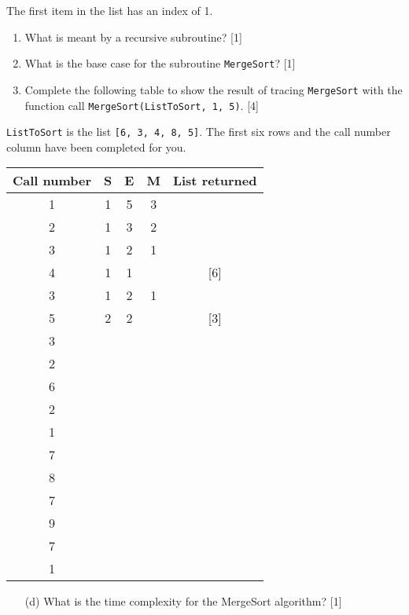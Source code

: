 The first item in the list has an index of 1. 
\begin{enumerate}
\item What is meant by a recursive subroutine? \hfill{}{[}1{]}
\item What is the base case for the subroutine \texttt{MergeSort}? \hfill{}
{[}1{]}
\item Complete the following table to show the result of tracing \texttt{MergeSort}
with the function call \texttt{MergeSort(ListToSort, 1, 5)}. \hfill{}{[}4{]}
\end{enumerate}
\texttt{ListToSort} is the list \texttt{{[}6, 3, 4, 8, 5{]}}. The
first six rows and the call number column have been completed for
you. 
\noindent \begin{center}
\begin{tabular}{|c|c|c|c|c|}
\hline 
\textbf{Call number} & \textbf{S} & \textbf{E} & \textbf{M} & \textbf{List returned}\tabularnewline
\hline 
1 & 1 & 5 & 3 & \tabularnewline
\hline 
2 & 1 & 3 & 2 & \tabularnewline
\hline 
3 & 1 & 2 & 1 & \tabularnewline
\hline 
4 & 1 & 1 &  & {[}6{]}\tabularnewline
\hline 
3 & 1 & 2 & 1 & \tabularnewline
\hline 
5 & 2 & 2 &  & {[}3{]}\tabularnewline
\hline 
3 &  &  &  & \tabularnewline
\hline 
2 &  &  &  & \tabularnewline
\hline 
6 &  &  &  & \tabularnewline
\hline 
2 &  &  &  & \tabularnewline
\hline 
1 &  &  &  & \tabularnewline
\hline 
7 &  &  &  & \tabularnewline
\hline 
8 &  &  &  & \tabularnewline
\hline 
7 &  &  &  & \tabularnewline
\hline 
9 &  &  &  & \tabularnewline
\hline 
7 &  &  &  & \tabularnewline
\hline 
1 &  &  &  & \tabularnewline
\hline 
\end{tabular}
\par\end{center}
\begin{enumerate}
\item[(d) ] What is the time complexity for the MergeSort algorithm? \hfill{}
{[}1{]}
\end{enumerate}